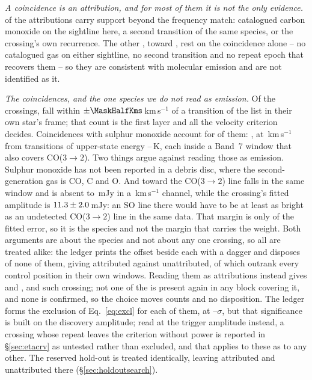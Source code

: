 \emph{A coincidence is an attribution, and for most of them it is not the
only evidence.} \LnAttrSupp{} of the \MkAttr{} attributions carry support
beyond the frequency match: catalogued carbon monoxide on the sightline here,
a second transition of the same species, or the crossing's own recurrence.
The other \LnAttrCoincWord, toward \LnCoincStars, rest on the coincidence
alone -- no catalogued gas on either sightline, no second transition and no
repeat epoch that recovers them -- so they are consistent with molecular
emission and are not identified as it.

\begin{table}
\centering
\footnotesize
\caption{The line mask, by species: the number of transitions $N$ it holds,
the frequency range they span inside the searched intervals and their
upper-state energies. Hydrogen recombination lines carry no tabulated
$E_{\rm u}$.}
\label{tab:masklines}

\end{table}

\emph{The coincidences, and the one species we do not read as emission.} Of
the \NCross{} crossings, \MkNCoinc{} fall within
$\pm\MaskHalfKms$\,km\,s$^{-1}$ of a transition of the list in their own
star's frame; that count is the first layer and all the velocity criterion
decides. Coincidences with sulphur monoxide account for \MkNSODecide{} of them:
\MkSOStars, at \MkSODvList\,km\,s$^{-1}$ from transitions of upper-state
energy \MkSOEuLo--\MkSOEuHi\,K, each inside a Band~7 window that also covers
CO($3\to2$). Two things argue against reading those as emission.
Sulphur monoxide has not been reported in a debris disc, where the
second-generation gas is CO, C and O. And toward \FrCpStar{} the CO($3\to2$)
line falls in the same window and is absent to \FrCpCoLimMJy\,mJy in a
\FrCpCoChanKms\,km\,s$^{-1}$ channel, while the crossing's fitted amplitude is
$11.3\pm2.0$\,mJy: an SO line there would have to be at
least as bright as an undetected CO($3\to2$) line in the same data. That
margin is only \RqAmpSigmaCp{} of the fitted error, so it is the species and
not the margin that carries the weight. Both arguments are about the species
and
not about any one crossing, so all \MkNSODecide{} are treated alike:
the ledger prints the offset beside each with a dagger and
disposes of none of them, giving \MkAttr{} attributed against \MkUnattr{}
unattributed, of which \MkRankLeadWord{} outrank every control position in
their own windows.
Reading them as attributions instead gives \MkAttrAlt{} and \MkUnattrAlt,
and \MkRankLeadAlt{} such crossing; not one of the \MkNSODecide{} is present
again in any block covering it, and none is confirmed, so the choice moves
counts and no disposition. The ledger forms the exclusion of
Eq.~\ref{eq:excl} for each of them, at
\MkAttrExclLo--\MkAttrExclHi$\sigma$, but that significance is built on the
discovery amplitude; read at the trigger amplitude instead, a crossing whose
repeat leaves the criterion without power is reported in
\S\ref{sec:etacrv} as untested rather than excluded, and that applies to
these as to any other. The reserved hold-out is treated identically, leaving
\HoNAttr{}
attributed and \HoNUnattr{} unattributed there (\S\ref{sec:holdoutsearch}).

